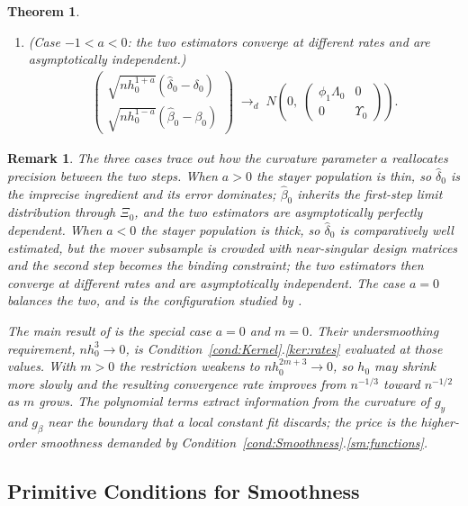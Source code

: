 \documentclass{article}
\newtheorem{theorem}{Theorem}
\newtheorem{remark}{Remark}
\begin{document}
\begin{theorem}
\begin{enumerate}
    \item[(iii)] \emph{(Case $-1<a<0$: the two estimators converge at different
    rates and are asymptotically independent.)}
    \begin{align*}
        \begin{pmatrix}
            \sqrt{nh_0^{1+a}}\left(\hat{\delta}_0-\delta_0\right)\\[2pt]
            \sqrt{nh_0^{1-a}}\left(\hat{\beta}_0-\beta_0\right)
        \end{pmatrix}
        \;\to_d\; N\!\left(0,\;
        \begin{pmatrix}\phi_1\Lambda_0 & 0\\ 0 & \Upsilon_0\end{pmatrix}\right).
    \end{align*}
\end{enumerate}
\end{theorem}

\begin{remark}
The three cases trace out how the curvature parameter $a$ reallocates precision between the two
steps. When $a>0$ the stayer population is thin, so $\hat\delta_0$ is the imprecise ingredient and
its error dominates; $\hat\beta_0$ inherits the first-step limit distribution through $\Xi_0$, and
the two estimators are asymptotically perfectly dependent. When $a<0$ the stayer population is
thick, so $\hat\delta_0$ is comparatively well estimated, but the mover subsample is crowded with
near-singular design matrices and the second step becomes the binding constraint; the two
estimators then converge at different rates and are asymptotically independent. The case $a=0$
balances the two, and is the configuration studied by \cite{grahampowell}.

The main result of \cite{grahampowell} is the special case $a=0$ and $m=0$. Their undersmoothing
requirement, $nh_0^{3}\to0$, is Condition~\ref{cond:Kernel}.\ref{ker:rates} evaluated at those
values. With $m>0$ the restriction weakens to $nh_0^{2m+3}\to0$, so $h_0$ may shrink more slowly and
the resulting convergence rate improves from $n^{-1/3}$ toward $n^{-1/2}$ as $m$ grows. The
polynomial terms extract information from the curvature of $g_y$ and $g_\beta$ near the boundary
that a local constant fit discards; the price is the higher-order smoothness demanded by
Condition~\ref{cond:Smoothness}.\ref{sm:functions}.
\end{remark}


\subsection{Primitive Conditions for Smoothness}\label{sec:primitive}
\end{document}
